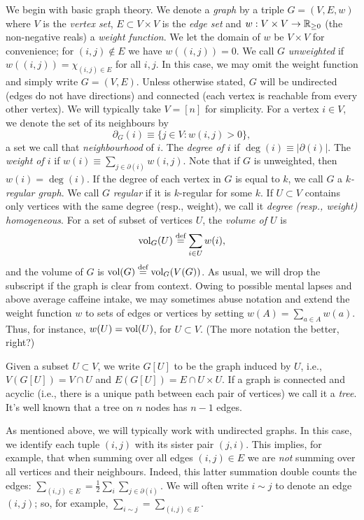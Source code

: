 We begin with basic graph theory. 
We denote a \emph{graph} by a triple $G=(V,E,w)$ where $V$ is the \emph{vertex set}, $E\subset V\times V$ is the \emph{edge set} and $w:V\times V\to\mathbb{R}_{\geq0}$ (the non-negative reals) a \emph{weight function}. We let the domain of $w$ be $V\times V$ for convenience; for $(i,j)\notin E$ we have $w((i,j))=0$. We call $G$ \emph{unweighted} if $w((i,j))=\chi_{(i,j)\in E}$ for all $i,j$. In this case, we may omit the weight function and simply write $G=(V,E)$. 
Unless otherwise stated, $G$ will be undirected (edges do not have  directions) and connected (each vertex is reachable from every other vertex). 
We will typically take $V=[n]$ for simplicity. For a  vertex $i\in V$, we denote the set of its neighbours by 
\begin{equation}
\label{eq:delta(i)}
\partial_G(i) \equiv  \{j\in V:w(i,j)>0\},
\end{equation}
a set we call that \emph{neighbourhood} of $i$. The \emph{degree of $i$} if $\deg(i)\equiv |\partial(i)|$. The \emph{weight of $i$} if $w(i)\equiv \sum_{j\in \partial(i)}w(i,j)$. Note that if $G$ is unweighted, then $w(i)=\deg(i)$. If the degree of each vertex in $G$ is equal to $k$, we call $G$ a \emph{$k$-regular graph}. We call $G$ \emph{regular} if it is $k$-regular for some $k$. If $U\subset V$ contains only vertices with the same degree (resp., weight), we call it \emph{degree (resp., weight) homogeneous}. 
For a set of subset of vertices $U$, the \emph{volume of $U$} is 
\begin{equation}
\label{eq:volU}
\textnormal{vol}_G(U) \overset{\text{def}}{=} \sum_{i\in U}w(i),
\end{equation}
and the volume of $G$ is $\textnormal{vol}(G) \overset{\text{def}}{=} \textnormal{vol}_G(V(G))$. As usual, we will drop the subscript if the graph is clear from context. 
Owing to possible mental lapses and above average caffeine intake, we may sometimes abuse notation and extend the weight function $w$ to sets of edges or vertices by setting $w(A)=\sum_{a\in A}w(a)$. Thus, for instance, $w(U) = \textnormal{vol}(U)$, for $U\subset V$. (The more notation the better, right?) 

Given a subset $U\subset  V$, we write $G[U]$ to be the graph induced by $U$, i.e., $V(G[U])  = V\cap U$ and  $E(G[U]) = E \cap U \times U$. If a graph is connected  and acyclic (i.e., there is a unique path between each pair of vertices) we call it a \emph{tree}. It's well known that a tree on $n$ nodes has $n-1$ edges.  

As mentioned above, we will typically  work  with undirected graphs. In this case, we identify each tuple $(i,j)$ with its sister pair $(j,i)$. This implies, for example, that when summing over all edges $(i,j)\in E$ we are \emph{not} summing over all vertices and their neighbours. Indeed, this latter summation double counts the edges: $\sum_{(i,j)\in E}=\frac{1}{2}\sum_{i}\sum_{j\in\partial(i)}$. We will often write $i\sim j$ to denote an edge $(i,j)$; so, for example, $\sum_{i\sim j}=\sum_{(i,j)\in E}$. 

